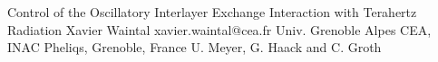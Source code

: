 \begin{conf-abstract}[]
{Control of the Oscillatory Interlayer Exchange Interaction with Terahertz Radiation}
{\color{blue} Xavier Waintal}
{xavier.waintal@cea.fr}
{Univ. Grenoble Alpes CEA, INAC Pheliqs, Grenoble, France}
{{\color{blue}U. Meyer, G. Haack and C. Groth}\\ \textit{}\\ 
\decofourleft \decofourright}





\printbibliography[heading=none]

\end{conf-abstract}
